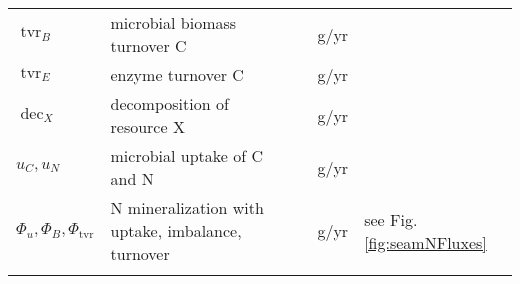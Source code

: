 \begin{table}[t]
\begin{tabular}{lp{6cm}llp{5.5cm}}
$\operatorname{tvr}_B $ & microbial biomass turnover C &  & g/yr & \\
$\operatorname{tvr}_E $ & enzyme turnover C &   & g/yr & \\
$\operatorname{dec}_X $ & decomposition of resource X & & g/yr & \\
$u_C,u_N$ & microbial uptake of C and N  & & g/yr & \\
$\Phi_u, \Phi_B, \Phi_{\operatorname{tvr}}$ & N mineralization with
uptake, imbalance, turnover & & g/yr & see Fig. \ref{fig:seamNFluxes}
\\
\bottomhline
\end{tabular}
\end{table}


